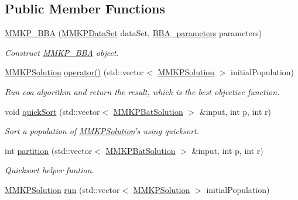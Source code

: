 \subsection*{Public Member Functions}
\begin{DoxyCompactItemize}
\item 
\hyperlink{class_m_m_k_p___b_b_a_a7599754269f5a07bcecc2c236ffe036a}{M\+M\+K\+P\+\_\+\+B\+B\+A} (\hyperlink{class_m_m_k_p_data_set}{M\+M\+K\+P\+Data\+Set} data\+Set, \hyperlink{class_b_b_a__parameters}{B\+B\+A\+\_\+parameters} parameters)
\begin{DoxyCompactList}\small\item\em Construct \hyperlink{class_m_m_k_p___b_b_a}{M\+M\+K\+P\+\_\+\+B\+B\+A} object. \end{DoxyCompactList}\item 
\hypertarget{class_m_m_k_p___b_b_a_ab38c1d657ea8308b3636be53f46644d8}{\hyperlink{class_m_m_k_p_solution}{M\+M\+K\+P\+Solution} \hyperlink{class_m_m_k_p___b_b_a_ab38c1d657ea8308b3636be53f46644d8}{operator()} (std\+::vector$<$ \hyperlink{class_m_m_k_p_solution}{M\+M\+K\+P\+Solution} $>$ initial\+Population)}\label{class_m_m_k_p___b_b_a_ab38c1d657ea8308b3636be53f46644d8}

\begin{DoxyCompactList}\small\item\em Run coa algorithm and return the result, which is the best objective function. \end{DoxyCompactList}\item 
void \hyperlink{class_m_m_k_p___b_b_a_ad03dd7cae1bef7d453ce6a3d14cbc58a}{quick\+Sort} (std\+::vector$<$ \hyperlink{struct_m_m_k_p_bat_solution}{M\+M\+K\+P\+Bat\+Solution} $>$ \&input, int p, int r)
\begin{DoxyCompactList}\small\item\em Sort a population of \hyperlink{class_m_m_k_p_solution}{M\+M\+K\+P\+Solution}'s using quicksort. \end{DoxyCompactList}\item 
\hypertarget{class_m_m_k_p___b_b_a_abb35fef62407d45a60e91c9b83c73cb3}{int \hyperlink{class_m_m_k_p___b_b_a_abb35fef62407d45a60e91c9b83c73cb3}{partition} (std\+::vector$<$ \hyperlink{struct_m_m_k_p_bat_solution}{M\+M\+K\+P\+Bat\+Solution} $>$ \&input, int p, int r)}\label{class_m_m_k_p___b_b_a_abb35fef62407d45a60e91c9b83c73cb3}

\begin{DoxyCompactList}\small\item\em Quicksort helper funtion. \end{DoxyCompactList}\item 
\hypertarget{class_m_m_k_p___b_b_a_af39d657752bd2443a11695d6728871b5}{\hyperlink{class_m_m_k_p_solution}{M\+M\+K\+P\+Solution} \hyperlink{class_m_m_k_p___b_b_a_af39d657752bd2443a11695d6728871b5}{run} (std\+::vector$<$ \hyperlink{class_m_m_k_p_solution}{M\+M\+K\+P\+Solution} $>$ initial\+Population)}\label{class_m_m_k_p___b_b_a_af39d657752bd2443a11695d6728871b5}


\end{DoxyCompactItemize}
